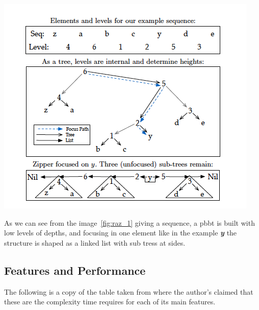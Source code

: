 \documentclass[12pt, a4paper]{article}
\begin{document}
\begin{minipage}[t]{\linewidth}
  \includegraphics[width=\textwidth]{raz_1}
  \captionsetup{type=figure}
  \label{fig:raz_1}
\end{minipage}

As we can see from the image~\ref{fig:raz_1} giving a sequence, a \acrshort{pbbt} is built with low levels of depths, and focusing in one element like in the example \textbf{\textit{y}} the structure is shaped as a linked list with sub tress at sides.

\subsection{Features and Performance}\label{sub:sec:2}
The following is a copy of the table taken from \cite{raz} where the author's claimed that these are the complexity time requires for each of its main features.
\end{document}
